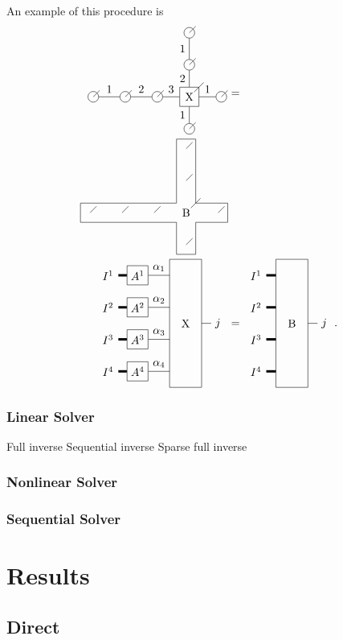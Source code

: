\documentclass[twocolumn]{article}
\newcounter{a}
\newcounter{b}
\begin{document}
\def \blockct { \begin{tikzpicture}[baseline=3]
        \draw (0,2.5)-- (0,-1.5) -- (1,-1.5)-- (1,2.5) -- cycle;

        \node[draw=none] (x)  at (0.5,0.5) {B};

        \draw[line width=0.75mm] (-0.3,2)  node [left] {$I^1$}  -- (0,2) ;
        \draw[line width=0.75mm] (-0.3,1)  node [left] {$I^2$} -- (0,1);
        \draw[line width=0.75mm] (-0.3,0)  node [left] {$I^3$} -- (0,0);
        \draw[line width=0.75mm] (-0.3,-1)  node [left] {$I^4$} -- (0,-1);

        \draw (1,0.5) -- (1.3,0.5)  node [right] {$j$} ;

    \end{tikzpicture} }

An example of this procedure is
\begin{align}
    \pepoat                    & =  \nonumber                                      \\
    \blockat                   &                                                   \\
    \vcenter{\hbox{ \pepoct }} & =\vcenter{\hbox{  \blockct }} . \label{extract_x}
\end{align}

\subsubsection{Linear Solver}

Full inverse
Sequential inverse
Sparse full inverse

\subsubsection{Nonlinear Solver}

\subsubsection{Sequential Solver}

\section{Results}
\subsection{Direct}

\end{document}
